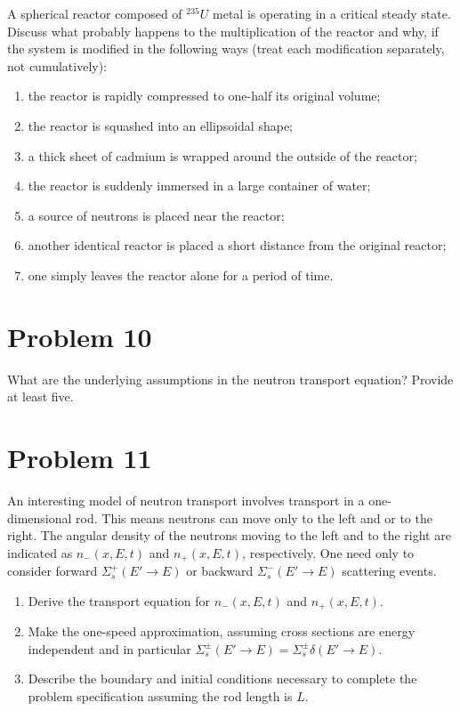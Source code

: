 \documentclass{article}
\begin{document}
A spherical reactor composed of $^{235}U$ metal is operating in a critical steady state. Discuss
what probably happens to the multiplication of the reactor and why, if the system is modified
in the following ways (treat each modification separately, not cumulatively):
\begin{enumerate}[label=(\alph*)]
\item the reactor is rapidly compressed to one-half its original volume;
\item the reactor is squashed into an ellipsoidal shape;
\item a thick sheet of cadmium is wrapped around the outside of the reactor;
\item the reactor is suddenly immersed in a large container of water;
\item a source of neutrons is placed near the reactor;
\item another identical reactor is placed a short distance from the original reactor;
\item one simply leaves the reactor alone for a period of time.
\end{enumerate}

\section*{Problem 10}

What are the underlying assumptions in the neutron transport equation? Provide at least five.

\section*{Problem 11}

An interesting model of neutron transport involves transport in a one-dimensional rod. This
means neutrons can move only to the left and or to the right. The angular density of the
neutrons moving to the left and to the right are indicated as $n_{-}(x,E,t)$ and $n_{+}(x,E,t)$,
respectively. One need only to consider forward $\Sigma^{+}_{s}
(E' \rightarrow E)$ or backward $\Sigma^{-}_{s}(E' \rightarrow E)$ scattering events.

\begin{enumerate}[label=(\alph*)]
\item Derive the transport equation for $n_{-}(x,E, t)$ and $n_{+}(x,E,t)$.
\item Make the one-speed approximation, assuming cross sections are energy independent and
in particular $\Sigma^{\pm}_{s}(E' \rightarrow E) = \Sigma^{\pm}_{s} \delta (E' \rightarrow E)$.
\item Describe the boundary and initial conditions necessary to complete the problem specification
assuming the rod length is $L$.
\end{enumerate}
\end{document}
